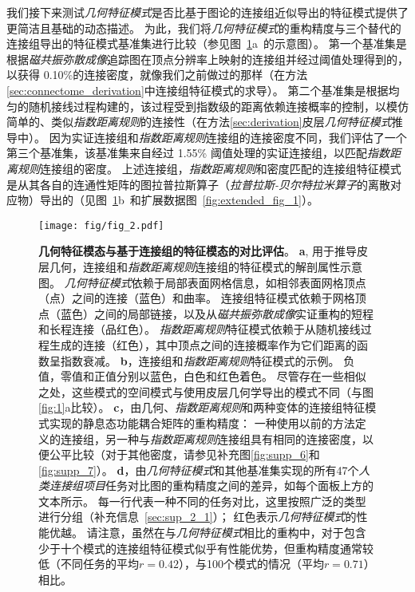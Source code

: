 \documentclass[lang=cn,a4paper,newtx]{elegantpaper}
\begin{document}
我们接下来测试\textit{几何特征模式}是否比基于图论的连接组近似导出的特征模式提供了更简洁且基础的动态描述。
为此，我们将\textit{几何特征模式}的重构精度与三个替代的连接组导出的特征模式基准集进行比较（参见图~\ref{fig:2}a~的示意图）。
第一个基准集是根据\textit{磁共振弥散成像}追踪图在顶点分辨率上映射的连接组并经过阈值处理得到的，以获得 0.10\%的连接密度，就像我们之前做过的那样（在方法\ref{sec:connectome_derivation}中连接组特征模式的求导）。
第二个基准集是根据均匀的随机接线过程构建的，该过程受到指数级的距离依赖连接概率的控制，以模仿简单的、类似\textit{指数距离规则}的连接性（在方法\ref{sec:derivation}皮层\textit{几何特征模式}推导中）。
因为实证连接组和\textit{指数距离规则}连接组的连接密度不同，我们评估了一个第三个基准集，该基准集来自经过 1.55\% 阈值处理的实证连接组，以匹配\textit{指数距离规则}连接组的密度。
上述连接组，\textit{指数距离规则}和密度匹配的连接组特征模式是从其各自的连通性矩阵的图拉普拉斯算子（\textit{拉普拉斯-贝尔特拉米算子}的离散对应物）导出的（见图~\ref{fig:2}b~和扩展数据图~\ref{fig:extended_fig_1}）。


\begin{figure}[!htb]
	\centering
	\texttt{[image: fig/fig\_2.pdf]}
	\caption{\textbf{几何特征模态与基于连接组的特征模态的对比评估}。
		\textbf{a}, 用于推导皮层几何，连接组和\textit{指数距离规则}连接组的特征模式的解剖属性示意图。
		\textit{几何特征模式}依赖于局部表面网格信息，如相邻表面网格顶点（点）之间的连接（蓝色）和曲率。
		连接组特征模式依赖于网格顶点（蓝色）之间的局部链接，以及从\textit{磁共振弥散成像}实证重构的短程和长程连接（品红色）。
		\textit{指数距离规则}特征模式依赖于从随机接线过程生成的连接（红色），其中顶点之间的连接概率作为它们距离的函数呈指数衰减。
		\textbf{b}，连接组和\textit{指数距离规则}特征模式的示例。
		负值，零值和正值分别以蓝色，白色和红色着色。
		尽管存在一些相似之处，这些模式的空间模式与使用皮层几何学导出的模式不同（与图\ref{fig:1}a比较）。
		\textbf{c}，由几何、\textit{指数距离规则}和两种变体的连接组特征模式实现的静息态功能耦合矩阵的重构精度：
		一种使用以前的方法\cite{naze2021robustness}定义的连接组，另一种与\textit{指数距离规则}连接组具有相同的连接密度，以便公平比较（对于其他密度，请参见补充图\ref{fig:supp_6}和\ref{fig:supp_7}）。
		\textbf{d}，由\textit{几何特征模式}和其他基准集实现的所有47个\textit{人类连接组项目}任务对比图的重构精度之间的差异，如每个面板上方的文本所示。
		每一行代表一种不同的任务对比，这里按照广泛的类型进行分组（补充信息~\ref{sec:sup_2_1}）；
		红色表示\textit{几何特征模式}的性能优越。
		请注意，虽然在与\textit{几何特征模式}相比的重构中，对于包含少于十个模式的连接组特征模式似乎有性能优势，但重构精度通常较低（不同任务的平均$ r = 0.42 $），与100个模式的情况（平均$ r = 0.71 $）相比。
	} \label{fig:2}
\end{figure}
\end{document}
